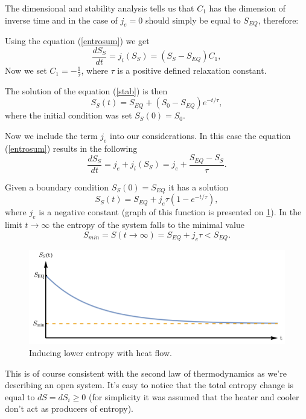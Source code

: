\documentclass[a4paper,12pt,nofootinbib]{article}
\begin{document}
The dimensional and stability analysis tells us that $C_1$ has the dimension of inverse time and in the case of 
$j_e=0$ should simply be equal to $S_{EQ}$, therefore:

Using the equation (\ref{entrosum}) we get
\begin{equation}
\frac{dS_S}{dt}=j_i\left(S_S\right)=\left(S_S-S_{EQ}\right)C_1, 
\label{stab}
\end{equation} 
Now we set $C_1 = -\frac{1}{\tau}$, where $\tau$ is a positive defined relaxation constant.

The solution of the equation (\ref{stab}) is then
\begin{equation}
S_S(t) =S_{EQ}+(S_0-S_{EQ})e^{-t/\tau}, 
\end{equation}
where the initial condition was set $S_S(0)=S_0$.


Now we include the term $j_e$ into our considerations.
In this case the equation (\ref{entrosum}) results in the following 
\begin{equation}
\frac{dS_S}{dt}=j_e + j_i\left(S_S\right)=j_e +\frac{S_{EQ}-S_S}{\tau}.
\label{dSSdt}
\end{equation} 

 
Given a boundary condition $S_S(0) =S_{EQ}$ it has a solution
\begin{equation}
S_S(t)=S_{EQ}+j_e\tau \left(1-e^{-t/\tau }\right),
\end{equation} 
where $j_e$ is a negative constant (graph of this function is presented on \ref{Fig4}). 
In the limit $t\rightarrow \infty$ the entropy of the system falls to the minimal value
\begin{equation}
S_{min}=S(t\rightarrow \infty) =S_{EQ}+j_e \tau < S_{EQ}.
\end{equation}

\begin{figure}[ht!]
\centering \includegraphics[width=12cm]{wykres3} 
\caption{Inducing lower entropy with heat flow.}
\label{Fig4} 
\end{figure}

This is of course consistent with the second law of thermodynamics as we're describing an open system.
It's easy to notice that the total entropy change is equal to $dS=dS_i \geq 0$ (for simplicity it was assumed that the heater and cooler don't act as producers of entropy).
\end{document}
